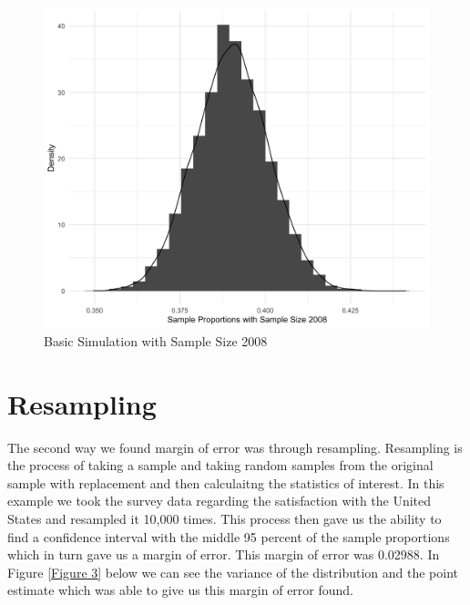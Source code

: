 \documentclass{article}\usepackage[]{graphicx}\usepackage[]{xcolor}
\begin{document}
\begin{multicols}{2}
\begin{figure}[H]
\begin{center}
\includegraphics[scale=0.14]{second.png}
\caption{Basic Simulation with Sample Size 2008}
\label{Figure 2}
\end{center}
\end{figure}

\section{Resampling}

The second way we found margin of error was through resampling. Resampling is the process of taking a sample and taking random samples from the original sample with replacement and then calculaitng the statistics of interest. In this example we took the survey data regarding the satisfaction with the United States and resampled it 10,000 times. This process then gave us the ability to find a confidence interval with the middle 95 percent of the sample proportions which in turn gave us a margin of error. This margin of error was 0.02988. In Figure \ref{Figure 3} below we can see the variance of the distribution and the point estimate which was able to give us this margin of error found. 


\end{multicols}
\end{document}

